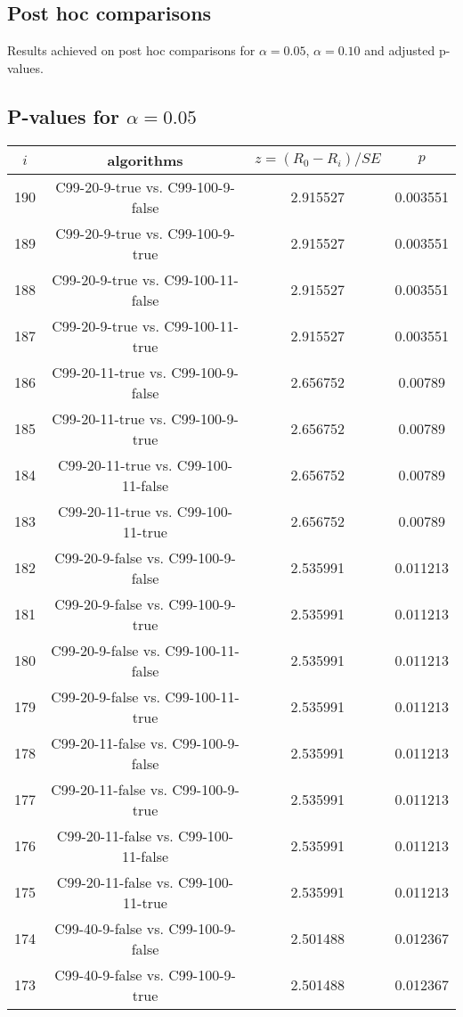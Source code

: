 \documentclass[a4paper,10pt]{article}
\begin{document}
\begin{landscape}
\pagebreak

\section{Post hoc comparisons}

Results achieved on post hoc comparisons for $\alpha = 0.05$, $\alpha = 0.10$ and adjusted p-values.

\subsection{P-values for $\alpha=0.05$}

\begin{table}[!htp]
\centering\scriptsize
\begin{tabular}{cccc}
$i$&algorithms&$z=(R_0 - R_i)/SE$&$p$\\
\hline190&C99-20-9-true vs. C99-100-9-false&2.915527&0.003551\\
189&C99-20-9-true vs. C99-100-9-true&2.915527&0.003551\\
188&C99-20-9-true vs. C99-100-11-false&2.915527&0.003551\\
187&C99-20-9-true vs. C99-100-11-true&2.915527&0.003551\\
186&C99-20-11-true vs. C99-100-9-false&2.656752&0.00789\\
185&C99-20-11-true vs. C99-100-9-true&2.656752&0.00789\\
184&C99-20-11-true vs. C99-100-11-false&2.656752&0.00789\\
183&C99-20-11-true vs. C99-100-11-true&2.656752&0.00789\\
182&C99-20-9-false vs. C99-100-9-false&2.535991&0.011213\\
181&C99-20-9-false vs. C99-100-9-true&2.535991&0.011213\\
180&C99-20-9-false vs. C99-100-11-false&2.535991&0.011213\\
179&C99-20-9-false vs. C99-100-11-true&2.535991&0.011213\\
178&C99-20-11-false vs. C99-100-9-false&2.535991&0.011213\\
177&C99-20-11-false vs. C99-100-9-true&2.535991&0.011213\\
176&C99-20-11-false vs. C99-100-11-false&2.535991&0.011213\\
175&C99-20-11-false vs. C99-100-11-true&2.535991&0.011213\\
174&C99-40-9-false vs. C99-100-9-false&2.501488&0.012367\\
173&C99-40-9-false vs. C99-100-9-true&2.501488&0.012367\\

\end{tabular}
\end{table}
\end{landscape}
\end{document}
